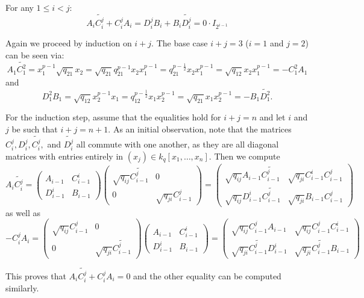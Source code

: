 \documentclass[12pt]{article}
\begin{document}
    \begin{lem}\label{lem:zero-matrix}
        For any $1\le i<j$:
        \[A_i\widetilde{C_i^j}+C_i^jA_{i} = D_i^jB_{i}+B_{i}\widetilde{D_i^j}=0\cdot I_{2^{i-1}}\]
    \end{lem}
    \begin{prf}
    Again we proceed by induction on $i+j.$ The base case $i+j=3$ ($i=1$ and $j=2$) can be seen via:
    \[A_1\widetilde{C_1^2}=x_1^{p-1}\sqrt{q_{21}}x_2=\sqrt{q_{21}}q_{21}^{p-1}x_2x_1^{p-1}=q_{21}^{p-\frac{1}{2}}x_2x_1^{p-1}=\sqrt{q_{12}}x_2x_1^{p-1}=-C_1^2 A_1\]
    and
    \[D_1^2B_1=\sqrt{q_{12}}x_2^{p-1}x_1=q_{12}^{p-\frac{1}{2}}x_1x_2^{p-1}=\sqrt{q_{21}}x_1x_2^{p-1}=-B_1\widetilde{D_1^2}.\]
    
    For the induction step, assume that the equalities hold for $i+j=n$ and let $i$ and $j$ be such that $i+j=n+1$. As an initial observation, note that the matrices $C_i^j, D_i^j, \widetilde{C_i^j},$ and $\widetilde{D_i^j}$ all commute with one another, as they are all diagonal matrices with entries entirely in $(x_j)\in k_q[x_1,\dots, x_n].$ Then we compute
    \[
        A_i\widetilde{C_i^j} =\begin{pmatrix}
            A_{i-1} & C_{i-1}^i\\ D_{i-1}^i & B_{i-1}
        \end{pmatrix}\begin{pmatrix}
            \sqrt{q_{ij}}\widetilde{C_{i-1}^j} & 0\\ 0 & \sqrt{q_{ji}}C_{i-1}^j
        \end{pmatrix}=\begin{pmatrix}
            \sqrt{q_{ij}}A_{i-1}\widetilde{C_{i-1}^j} & \sqrt{q_{ji}}C_{i-1}^iC_{i-1}^j\\
            \sqrt{q_{ij}}D_{i-1}^i\widetilde{C_{i-1}^j} & \sqrt{q_{ji}}B_{i-1}C_{i-1}^j
        \end{pmatrix}
    \]
    as well as
    \[-C_i^jA_i = \begin{pmatrix}
            \sqrt{q_{ij}}C_{i-1}^j & 0\\ 0 & \sqrt{q_{ji}}\widetilde{C_{i-1}^j}
        \end{pmatrix}\begin{pmatrix}
            A_{i-1} & C_{i-1}^i\\ D_{i-1}^i & B_{i-1}
        \end{pmatrix}=\begin{pmatrix}
            \sqrt{q_{ij}}C_{i-1}^jA_{i-1} & \sqrt{q_{ij}}C_{i-1}^jC_{i-1}^i\\
            \sqrt{q_{ji}}\widetilde{C_{i-1}^j}D_{i-1}^i & \sqrt{q_{ji}}\widetilde{C_{i-1}^j}B_{i-1}
        \end{pmatrix}\]
    
    This proves that $A_i\widetilde{C_i^j}+C_i^jA_i=0$ and the other equality can be computed similarly.
    \end{prf}
\end{document}
